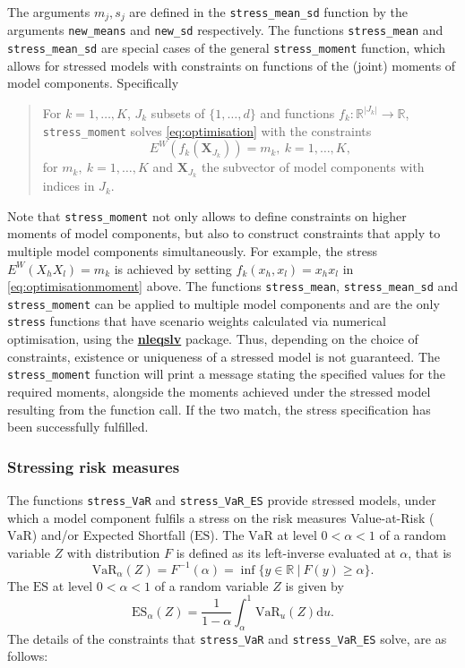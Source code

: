 \documentclass[
]{article}
\begin{document}
The arguments \(m_j, s_j\) are defined in the \texttt{stress\_mean\_sd} function by the arguments \texttt{new\_means} and \texttt{new\_sd} respectively. The functions \texttt{stress\_mean} and \texttt{stress\_mean\_sd} are special cases of the general \texttt{stress\_moment} function, which allows for stressed models with constraints on functions of the (joint) moments of model components. Specifically

\begin{quote}
For \(k = 1, \ldots, K\), \(J_k\) subsets of \(\{1, \ldots, d\}\) and functions \(f_k \colon \mathbb{R}^{|J_k|} \to \mathbb{R}\), \texttt{stress\_moment} solves \eqref{eq:optimisation} with the constraints
\begin{equation} 
E^W(f_k(\mathbf X_{J_k}) ) = m_k, ~k = 1, \ldots, K, \label{eq:optimisationmoment}
\end{equation}
for \(m_k, ~k=1, \dots,K\) and \(\mathbf X_{J_k}\) the subvector of model components with indices in \(J_k\).
\end{quote}

Note that \texttt{stress\_moment} not only allows to define constraints on higher moments of model components, but also to construct constraints that apply to multiple model components simultaneously. For example, the stress \(E^W(X_h X_l) =m_k\) is achieved by setting \(f_k(x_h, x_l) = x_h x_l\) in \eqref{eq:optimisationmoment} above. The functions \texttt{stress\_mean}, \texttt{stress\_mean\_sd} and \texttt{stress\_moment} can be applied to multiple model components and are the only \texttt{stress} functions that have scenario weights calculated via numerical optimisation, using the \href{https://CRAN.R-project.org/package=nleqslv}{\textbf{nleqslv}} package. Thus, depending on the choice of constraints, existence or uniqueness of a stressed model is not guaranteed. The \texttt{stress\_moment} function will print a message stating the specified values for the required moments, alongside the moments achieved under the stressed model resulting from the function call. If the two match, the stress specification has been successfully fulfilled.

\hypertarget{Sec:RiskMeasures}{%
\subsubsection{Stressing risk measures}\label{Sec:RiskMeasures}}

The functions \texttt{stress\_VaR} and \texttt{stress\_VaR\_ES} provide stressed models, under which a model component fulfils a stress on the risk measures Value-at-Risk (\(\text{VaR}\)) and/or Expected Shortfall (\(\text{ES}\)). The \(\text{VaR}\) at level \(0 < \alpha < 1\) of a random variable \(Z\) with distribution \(F\) is defined as its left-inverse evaluated at \(\alpha\), that is
\[\text{VaR}_\alpha(Z) = F^{-1}(\alpha) = \inf\{ y \in \mathbb{R} ~|~F(y) \geq \alpha\}.\]
The \(\text{ES}\) at level \(0 < \alpha < 1\) of a random variable \(Z\) is given by \[\text{ES}_\alpha(Z) =\frac{1}{1-\alpha}\int_\alpha^1 \text{VaR}_u(Z) \mathrm{d}u.\]
The details of the constraints that \texttt{stress\_VaR} and \texttt{stress\_VaR\_ES} solve, are as follows:
\end{document}

